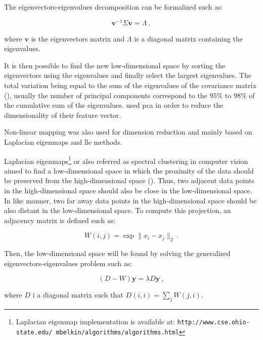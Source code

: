 The eigenvectors-eigenvalues decomposition can be formalized such as:

\begin{equation}
	\mathbf{v}^{-1} \Sigma \mathbf{v} = \Lambda \ ,
	\label{eq:eigpca}
\end{equation}

\noindent where $\mathbf{v}$ is the eigenvectors matrix and $\Lambda$ is a diagonal matrix containing the eigenvalues. 

It is then possible to find the new low-dimensional space by sorting the eigenvectors using the eigenvalues and finally select the largest eigenvalues. The total variation being equal to the sum of the eigenvalues of the covariance matrix (\cite{Fodor2002}), usually the number of principal components correspond to the $95\%$ to $98\%$ of the cumulative sum of the eigenvalues. \cite{Tiwari2008,Tiwari2009,Tiwari2012} used \ac{pca} in order to reduce the dimensionality of their feature vector.

Non-linear mapping was also used for dimension reduction and mainly based on Laplacian eigenmaps and \acf{lle} methods.

Laplacian eigenmaps\footnote{Laplacian eigenmap implementation is available at: \texttt{http://www.cse.\allowbreak ohio-state.edu/~mbelkin/algorithms/algorithms.html}} or also referred as spectral clustering in computer vision aimed to find a low-dimensional space in which the proximity of the data should be preserved from the high-dimensional space (\cite{Shi2000,Belkin2001}). Thus, two adjacent data points in the high-dimensional space should also be close in the low-dimensional space. In like manner, two far away data points in the high-dimensional space should be also distant in the low-dimensional space. To compute this projection, an adjacency matrix is defined such as:

\begin{equation}
	W(i,j) = \exp \| x_i - x_j \|_2 \ .
	\label{eq:gew}
\end{equation}

Then, the low-dimensional space will be found by solving the generalized eigenvectors-eigenvalues problem such as:

\begin{equation}
	(D-W)\mathbf{y} = \lambda D \mathbf{y} \ ,
	\label{eq:geeig}
\end{equation}

\noindent where $D$ i a diagonal matrix such that $D(i,i) = \sum_j W(j,i)$.

